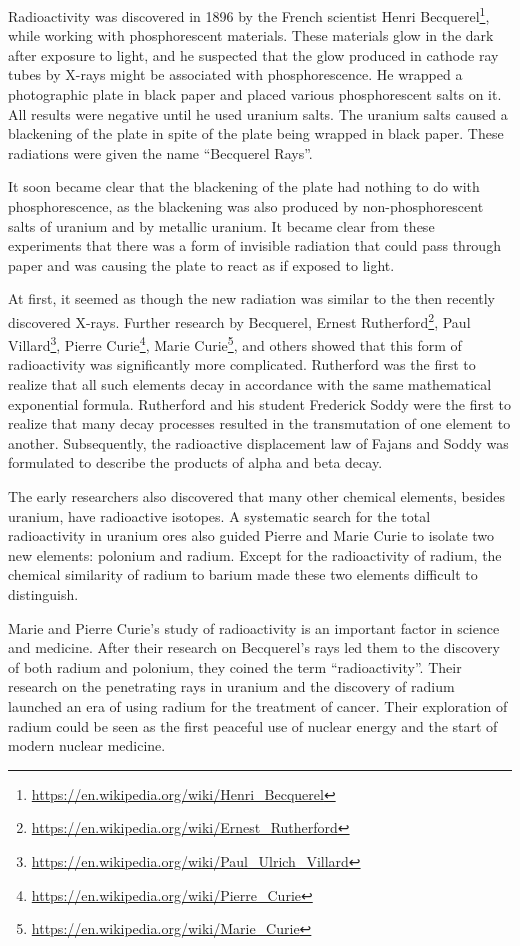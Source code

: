 \documentclass[
]{book}
\renewcommand{\href}[2]{#2\footnote{\url{#1}}}
\begin{document}
Radioactivity was discovered in 1896 by the French scientist \href{https://en.wikipedia.org/wiki/Henri_Becquerel}{Henri Becquerel}, while working with phosphorescent materials. These materials glow in the dark after exposure to light, and he suspected that the glow produced in cathode ray tubes by X-rays might be associated with phosphorescence. He wrapped a photographic plate in black paper and placed various phosphorescent salts on it. All results were negative until he used uranium salts. The uranium salts caused a blackening of the plate in spite of the plate being wrapped in black paper. These radiations were given the name ``Becquerel Rays''.

It soon became clear that the blackening of the plate had nothing to do with phosphorescence, as the blackening was also produced by non-phosphorescent salts of uranium and by metallic uranium. It became clear from these experiments that there was a form of invisible radiation that could pass through paper and was causing the plate to react as if exposed to light.

At first, it seemed as though the new radiation was similar to the then recently discovered X-rays. Further research by Becquerel, \href{https://en.wikipedia.org/wiki/Ernest_Rutherford}{Ernest Rutherford}, \href{https://en.wikipedia.org/wiki/Paul_Ulrich_Villard}{Paul Villard}, \href{https://en.wikipedia.org/wiki/Pierre_Curie}{Pierre Curie}, \href{https://en.wikipedia.org/wiki/Marie_Curie}{Marie Curie}, and others showed that this form of radioactivity was significantly more complicated. Rutherford was the first to realize that all such elements decay in accordance with the same mathematical exponential formula. Rutherford and his student Frederick Soddy were the first to realize that many decay processes resulted in the transmutation of one element to another. Subsequently, the radioactive displacement law of Fajans and Soddy was formulated to describe the products of alpha and beta decay.

The early researchers also discovered that many other chemical elements, besides uranium, have radioactive isotopes. A systematic search for the total radioactivity in uranium ores also guided Pierre and Marie Curie to isolate two new elements: polonium and radium. Except for the radioactivity of radium, the chemical similarity of radium to barium made these two elements difficult to distinguish.

Marie and Pierre Curie's study of radioactivity is an important factor in science and medicine. After their research on Becquerel's rays led them to the discovery of both radium and polonium, they coined the term ``radioactivity''. Their research on the penetrating rays in uranium and the discovery of radium launched an era of using radium for the treatment of cancer. Their exploration of radium could be seen as the first peaceful use of nuclear energy and the start of modern nuclear medicine.
\end{document}
